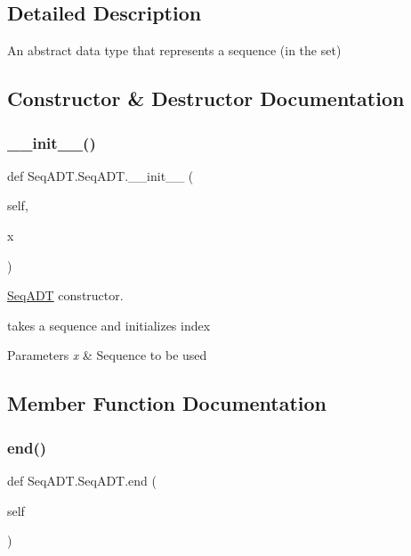 \subsection{Detailed Description}
An abstract data type that represents a sequence (in the set) 

\subsection{Constructor \& Destructor Documentation}
\mbox{\label{class_seq_a_d_t_1_1_seq_a_d_t_a9330066e7aa744127c86671e1a66e155}} 
\subsubsection{\texorpdfstring{\_\_init\_\_()}{\_\_init\_\_()}}
{\footnotesize\ttfamily def Seq\+A\+D\+T.\+Seq\+A\+D\+T.\+\_\+\+\_\+init\+\_\+\+\_\+ (\begin{DoxyParamCaption}\item[{}]{self,  }\item[{}]{x }\end{DoxyParamCaption})}



\mbox{\hyperlink{class_seq_a_d_t_1_1_seq_a_d_t}{Seq\+A\+DT}} constructor. 

takes a sequence and initializes index 
\begin{DoxyParams}{Parameters}
{\em x} & Sequence to be used \\
\hline
\end{DoxyParams}


\subsection{Member Function Documentation}
\mbox{\label{class_seq_a_d_t_1_1_seq_a_d_t_a7d8df17dae5df548ca32054075ca04b8}} 
\subsubsection{\texorpdfstring{end()}{end()}}
{\footnotesize\ttfamily def Seq\+A\+D\+T.\+Seq\+A\+D\+T.\+end (\begin{DoxyParamCaption}\item[{}]{self }\end{DoxyParamCaption})}



